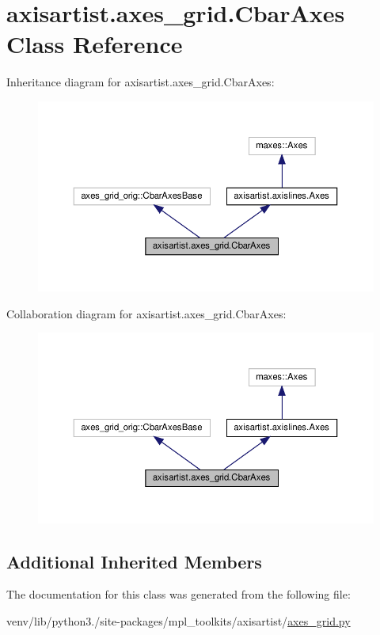 \hypertarget{classaxisartist_1_1axes__grid_1_1CbarAxes}{}\section{axisartist.\+axes\+\_\+grid.\+Cbar\+Axes Class Reference}
\label{classaxisartist_1_1axes__grid_1_1CbarAxes}


Inheritance diagram for axisartist.\+axes\+\_\+grid.\+Cbar\+Axes\+:
\nopagebreak
\begin{figure}[H]
\begin{center}
\leavevmode
\includegraphics[width=350pt]{classaxisartist_1_1axes__grid_1_1CbarAxes__inherit__graph}
\end{center}
\end{figure}


Collaboration diagram for axisartist.\+axes\+\_\+grid.\+Cbar\+Axes\+:
\nopagebreak
\begin{figure}[H]
\begin{center}
\leavevmode
\includegraphics[width=350pt]{classaxisartist_1_1axes__grid_1_1CbarAxes__coll__graph}
\end{center}
\end{figure}
\subsection*{Additional Inherited Members}


The documentation for this class was generated from the following file\+:\begin{DoxyCompactItemize}
\item 
venv/lib/python3./site-\/packages/mpl\+\_\+toolkits/axisartist/\hyperlink{axisartist_2axes__grid_8py}{axes\+\_\+grid.\+py}\end{DoxyCompactItemize}
